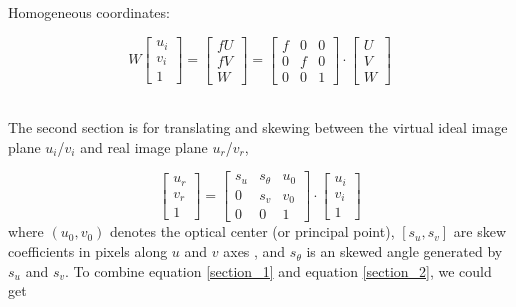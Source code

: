 \quad\quad Homogeneous coordinates:\par
\begin{equation}
%
W \left[ \begin{array}{c} u_i \\ v_i \\ 1 \end{array} \right] %
= %
\left[ \begin{array}{c} fU \\ fV \\ W \end{array} \right]%
=  \begin{bmatrix} f & 0 & 0 \\ 0 & f & 0 \\ 0 & 0 & 1 \end{bmatrix} \cdot %
\left[ \begin{array}{c} U \\ V \\ W \end{array} \right]%
\label{section_1}
\end{equation}%
\\\par
%
The second section is for translating and skewing between the virtual ideal image plane \(u_i\)/\(v_i\) and real image plane \(u_r\)/\(v_r\),  %

\begin{equation}
%
\left[ \begin{array}{c} u_r \\ v_r \\ 1 \end{array} \right] %
=  \begin{bmatrix} s_u & s_\theta & u_0 \\ 0 & s_v & v_0 \\ 0 & 0 & 1 \end{bmatrix} \cdot %
\left[ \begin{array}{c} u_i \\ v_i \\ 1 \end{array} \right]%
\label{section_2}
\end{equation}%
where \((u_0, v_0)\) denotes the optical center (or principal point), \([s_u, s_v]\) are skew coefficients in pixels along \(u\) and  \(v\) axes , and  \(s_\theta\) is an skewed angle generated by \(s_u\) and  \(s_v\). To combine equation \ref{section_1} and equation \ref{section_2}, we could get %

